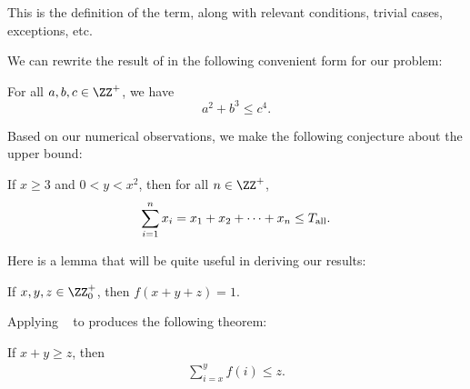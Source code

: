 \begin{Thm:Definition}
This is the definition of the term, along with relevant conditions, trivial cases, exceptions, etc.
\end{Thm:Definition}

We can rewrite the result of \cite[Theorem~2.5]{IEEEexample:conf_typical} in the following convenient form for our problem:

\begin{Thm:Proposition}
For all \mbox{$a,b,c\in\ZZ^+$}, we have
\label{Thm:Proposition:ChapAbbr:PropositionExample}
\[
a^2+b^3\leq c^4.
\]
\end{Thm:Proposition}

Based on our numerical observations, we make the following conjecture about the upper bound:

\begin{Thm:Conjecture}
If \mbox{$x\geq 3$} and \mbox{$0<y<x^2$}, then for all \mbox{$n\in\ZZ^+$},
\[
\sum_{i=1}^{n} x_i
= x_1 + x_2 + \cdots + x_n
\leq T_{\textup{all}}.
\]
\end{Thm:Conjecture}

Here is a lemma that will be quite useful in deriving our results:

\begin{Thm:Lemma}
\label{Thm:Lemma:ChapAbbr:LemmaExampleA}
If \mbox{$x,y,z\in\ZZ^+_0$}, then \mbox{$f(x+y+z) = 1$}.
\end{Thm:Lemma}

Applying \Lemma~ to \cite[Theorem~4.2]{IEEEexample:book_typical} produces the following theorem:

\begin{Thm:Theorem}
\label{Thm:Theorem:ChapAbbr:TheoremExample}
If \mbox{$x+y\geq z$}, then
\begin{align*}
\sum_{i=x}^{y} f(i) \leq z.
\end{align*}
\end{Thm:Theorem}

